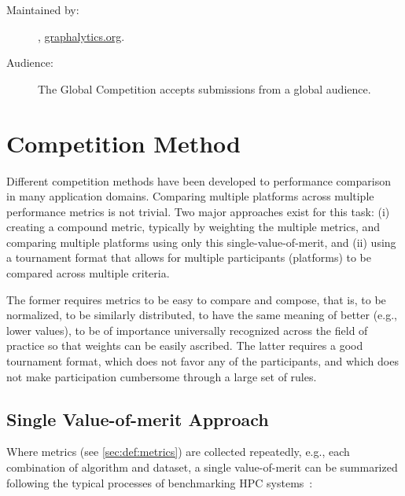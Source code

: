 \begin{description}
    \item[Maintained by:] \toolname, \url{graphalytics.org}.
    \item[Audience:] The Global \toolname{} Competition accepts submissions from a global audience.
\end{description} 











\section{Competition Method} \label{sec:competitions}
Different competition methods have been developed to performance comparison in many application domains. Comparing multiple platforms across multiple performance metrics is not trivial. Two major approaches exist for this task: (i) creating a compound metric, typically by weighting the multiple metrics, and comparing multiple platforms using only this single-value-of-merit, and (ii) using a tournament format that allows for multiple participants (platforms) to be compared across multiple criteria. 

The former requires metrics to be easy to compare and compose, that is, to be normalized, to be similarly distributed, to have the same meaning of better (e.g., lower values), to be of importance universally recognized across the field of practice so that weights can be easily ascribed. The latter requires a good tournament format, which does not favor any of the participants, and which does not make participation cumbersome through a large set of rules.


\subsection{Single Value-of-merit Approach} \label{sec:competitions:single_value}
Where metrics (see \autoref{sec:def:metrics}) are collected repeatedly, e.g., each combination of algorithm and dataset, a single value-of-merit can be summarized following the typical processes of benchmarking HPC systems~\cite{DBLP:conf/sc/HoeflerB15}:

